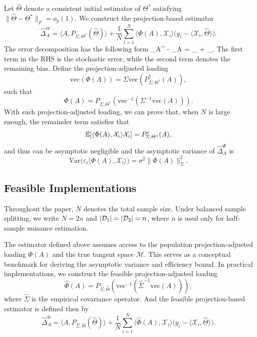 \documentclass[authoryear,preprint,review,12pt]{elsarticle}
\begin{document}
	Let $\widehat{\Theta}$ denote a consistent initial estimator of $\Theta^\ast$ satisfying $\|\widehat{\Theta}-\Theta^\ast\|_F=o_p(1)$. 
	We construct the projection-based estimator
	\begin{equation}
		\widehat{\Delta}_A^{\mathrm{or}}
		=
		\langle A, P_{{\Sigma},{\Theta}^\ast}(\widehat{\Theta}) \rangle
		+
		\frac{1}{N} \sum_{i=1}^N \langle {\Phi}(A), \mathcal{X}_i \rangle
		\big(
		y_i - \langle \mathcal{X}_i, \widehat{\Theta} \rangle
		\big).
	\end{equation} 
	The error decomposition has the following form 
	\be\label{eq:err1}\widehat{\Delta}_A^{} - {\Delta}_A  = _{}  + _{}.\ee
	The first term in the RHS  is the stochastic error, while the second term denotes the remaining bias.
	Define the projection-adjusted loading
	\[
	\mathrm{vec}({\Phi}(A)) = \Sigma \mathrm{vec}(P_{{\Sigma},{\Theta}^\ast}^\ast(A)),
	\]
	such that
	\[
	{\Phi}(A) =  P_{\Sigma, \Theta^\ast}( \mathrm{vec}^{-1}(\Sigma^{-1}\mathrm{vec}(A))).
	\]
	With such projection-adjusted loading, we can prove that, when $N$ is large enough, the remainder term satisfies that
	$$\mathbb{E}[ \langle  {\Phi}(A), \mathcal{X}_i \rangle     \mathcal{X}_i] =P_{{\Sigma},{\Theta}^\ast}^\ast(A),$$
	and thus can be asymptotic negligible and the asymptotic variance of $\widehat{\Delta}_A^{\Phi}$ is 
	\[
	\mathrm{Var}\big( \varepsilon_i\langle \Phi(A), \mathcal{X}_i \rangle \big)
	= \sigma^2 
	\|\Phi(A)\|_\Sigma^2.
	\]
	
	\subsection{Feasible Implementations}
	
	Throughout the paper, \(N\) denotes the total sample size. Under balanced sample splitting, we write \(N=2n\) and \(|\mathcal{D}_1|=|\mathcal{D}_2|=n\), where \(n\) is used only for half-sample nuisance estimation.
	
	The estimator defined above assumes access to the population  projection-adjusted loading ${\Phi}(A)$
	and  the true tangent space $\mathcal{M}$.  
	This serves as a conceptual benchmark for deriving the asymptotic variance and efficiency bound.
	In practical implementations, we construct  the feasible projection-adjusted loading
	\[
	\widehat{\Phi}(A)
	=  P_{\widehat{\Sigma},\widehat{\Theta}}( \mathrm{vec}^{-1}(\widehat\Sigma^{-1}\mathrm{vec}(A))),
	\]
	where $\widehat{\Sigma}$ is the empirical covariance operator.  
	And the feasible projection-based estimator is defined then by 
	\begin{equation}
		\widehat{\Delta}_A^{\mathrm{fe}}
		=
		\langle A, P_{\widehat{\Sigma},\widehat{\Theta}}(\widehat{\Theta}) \rangle
		+
		\frac{1}{N}
		\sum_{i=1}^N
		\langle \widehat{\Phi}(A), \mathcal{X}_i \rangle
		\big(
		y_i - \langle \mathcal{X}_i, \widehat{\Theta} \rangle
		\big).
	\end{equation} 
\end{document}
